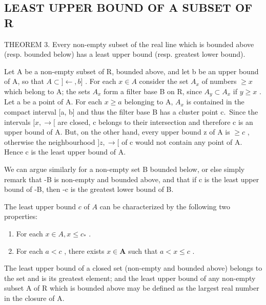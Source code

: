 \subsection{LEAST UPPER BOUND OF A SUBSET OF R}

THEOREM 3. Every non-empty subset of the real line which is bounded above (resp. bounded below) has a least upper bound (resp. greatest lower bound).

Let A be a non-empty subset of R, bounded above, and let b be an upper bound of A, so that \(A \subset ] \leftarrow, b]\) . For each \(x \in A\) consider the set \(A_x\) of numbers \(\geqslant x\) which belong to A; the sets \(A_x\) form a filter base B on R, since \(A_y \subset A_x\) if \(y \geqslant x\) . Let a be a point of A. For each \(x \geqslant a\) belonging to A, \(A_x\) is contained in the compact interval {[}a, b{]} and thus the filter base B has a cluster point c.~Since the intervals \([x, \rightarrow[\) are closed, c belongs to their intersection and therefore c is an upper bound of A. But, on the other hand, every upper bound z of A is \(\geqslant c\) , otherwise the neighbourhood \(]z, \rightarrow[\) of c would not contain any point of A. Hence c is the least upper bound of A.

We can argue similarly for a non-empty set B bounded below, or else simply remark that -B is non-empty and bounded above, and that if c is the least upper bound of -B, then -c is the greatest lower bound of B.

The least upper bound \(c\) of \(A\) can be characterized by the following two properties:

\begin{enumerate}
\def\labelenumi{(\roman{enumi})}
\item
  For each \(x \in A, x \leqslant c_*\) .
\item
  For each \(a < c\) , there exists \(x \in \mathbf{A}\) such that \(a < x \leqslant c\) .
\end{enumerate}

The least upper bound of a closed set (non-empty and bounded above) belongs to the set and is its greatest element; and the least upper bound of any non-empty subset A of R which is bounded above may be defined as the largest real number in the closure of A.

